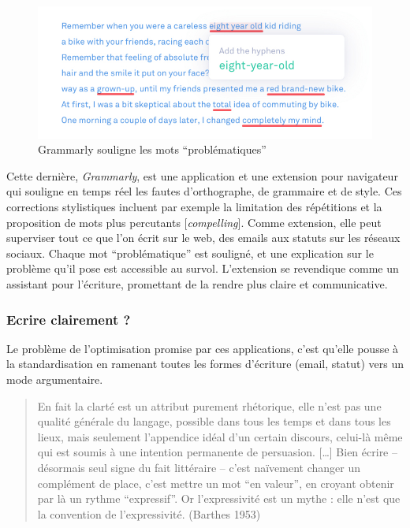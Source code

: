 \documentclass[]{article}
\begin{document}
\begin{figure}
\centering
\includegraphics{./tex2pdf.2952/7e83c21e6796d91bba646886acdde75e134357da.jpg}
\caption{Grammarly souligne les mots ``problématiques''}
\end{figure}

Cette dernière, \emph{Grammarly}, est une application et une extension
pour navigateur qui souligne en temps réel les fautes d'orthographe, de
grammaire et de style. Ces corrections stylistiques incluent par exemple
la limitation des répétitions et la proposition de mots plus percutants
{[}\emph{compelling}{]}. Comme extension, elle peut superviser tout ce
que l'on écrit sur le web, des emails aux statuts sur les réseaux
sociaux. Chaque mot ``problématique'' est souligné, et une explication
sur le problème qu'il pose est accessible au survol. L'extension se
revendique comme un assistant pour l'écriture, promettant de la rendre
plus claire et communicative.

\hypertarget{ecrire-clairement}{%
\subsubsection{Ecrire clairement ?}\label{ecrire-clairement}}

Le problème de l'optimisation promise par ces applications, c'est
qu'elle pousse à la standardisation en ramenant toutes les formes
d'écriture (email, statut) vers un mode argumentaire.

\begin{quote}
En fait la clarté est un attribut purement rhétorique, elle n'est pas
une qualité générale du langage, possible dans tous les temps et dans
tous les lieux, mais seulement l'appendice idéal d'un certain discours,
celui-là même qui est soumis à une intention permanente de persuasion.
{[}\ldots{}{]} Bien écrire -- désormais seul signe du fait littéraire --
c'est naïvement changer un complément de place, c'est mettre un mot ``en
valeur'', en croyant obtenir par là un rythme ``expressif''. Or
l'expressivité est un mythe : elle n'est que la convention de
l'expressivité. (Barthes 1953)
\end{quote}
\end{document}
